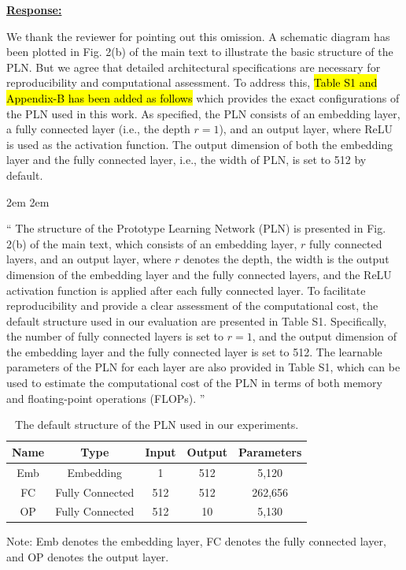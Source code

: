 \documentclass[a4paper,12pt]{article}
\newcommand{\hlb}[1]{\sethlcolor{b}\hl{#1}}
\begin{document}
\noindent \underline {\textbf{Response:}}
\bigskip

We thank the reviewer for pointing out this omission.
A schematic diagram has been plotted in Fig. 2(b) of the main text to illustrate the basic structure of the PLN.
But we agree that detailed architectural specifications are necessary for reproducibility and computational assessment.
To address this, \hlb{Table S1 and Appendix-B has been added as follows} which provides the exact configurations of the PLN used in this work.
As specified, the PLN consists of an embedding layer, a fully connected layer (i.e., the depth $r=1$), and an output layer, where ReLU is used as the activation function.
The output dimension of both the embedding layer and the fully connected layer, i.e., the width of PLN, is set to 512 by default.

\leftskip 2em
\rightskip 2em
\medskip

\noindent
``
The structure of the Prototype Learning Network (PLN) is presented in Fig. 2(b) of the main text, which consists of an embedding layer, $r$ fully connected layers, and an output layer, where $r$ denotes the depth, the width is the output dimension of the embedding layer and the fully connected layers, and the ReLU activation function is applied after each fully connected layer.
To facilitate reproducibility and provide a clear assessment of the computational cost, the default structure used in our evaluation are presented in Table S1.
Specifically, the number of fully connected layers is set to $r=1$, and the output dimension of the embedding layer and the fully connected layer is set to 512.
The learnable parameters of the PLN for each layer are also provided in Table S1, which can be used to estimate the computational cost of the PLN in terms of both memory and floating-point operations (FLOPs).
''
\begin{table}[h]
    \centering
    \caption{The default structure of the PLN used in our experiments.}
    \label{tab:pln}
        \begin{threeparttable}
            \begin{tabular}{c|cccc}
                \hline
                Name & Type & Input & Output & Parameters \\
                \hline
                Emb & Embedding & 1 & 512 & 5,120 \\
                FC & Fully Connected & 512 & 512 & 262,656 \\
                OP & Fully Connected & 512 & 10 & 5,130 \\
                \hline
            \end{tabular}
            \begin{tablenotes}
                \footnotesize
                \item Note: Emb denotes the embedding layer, FC denotes the fully connected layer, and OP denotes the output layer.
            \end{tablenotes}
        \end{threeparttable}
\end{table}
\end{document}
